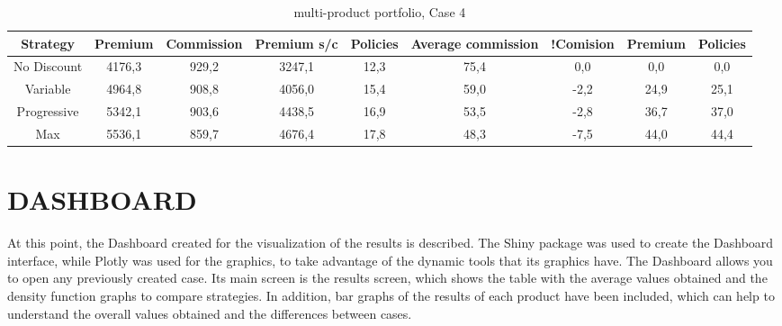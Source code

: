 \documentclass[review]{elsarticle}
\begin{document}
\begin{table}[htb]
\centering
\caption{multi-product portfolio, Case 4}
\label{tab:b5}
\begin{tabular}{c c c c c c c c c}
        \hline
        \hline
        Strategy & Premium & Commission & Premium s/c & Policies & Average commission & !Comision &Premium & Policies \\
        \hline
        No Discount & 4176,3 & 929,2 & 3247,1 & 12,3 & 75,4 & 0,0 & 0,0 & 0,0\\
        \hline
        Variable & 4964,8 & 908,8 & 4056,0 & 15,4 & 59,0 & -2,2 & 24,9 & 25,1 \\
        \hline
        Progressive & 5342,1 & 903,6 & 4438,5 & 16,9 & 53,5 & -2,8 & 36,7 & 37,0 \\
        Max & 5536,1 & 859,7 & 4676,4 & 17,8 & 48,3 & -7,5 & 44,0 & 44,4 \\
        \hline
\end{tabular}
\end{table}

\section{DASHBOARD}

At this point, the Dashboard created for the visualization of the results is described.
The Shiny package was used to create the Dashboard interface, while Plotly was used for the graphics, to take advantage of the dynamic tools that its graphics have.
The Dashboard allows you to open any previously created case. Its main screen is the results screen, which shows the table with the average values obtained and the density function graphs to compare strategies.
In addition, bar graphs of the results of each product have been included, which can help to understand the overall values obtained and the differences between cases.

\end{document}
